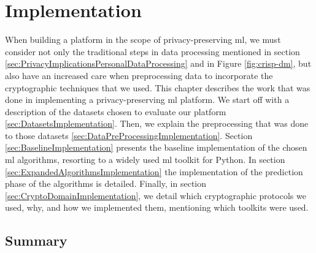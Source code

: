 %

\acresetall

\chapter{Implementation}
\label{ch:Implementation}

When building a platform in the scope of privacy-preserving \ac{ml}, we must consider not only the traditional steps in data processing mentioned in section \ref{sec:PrivacyImplicationsPersonalDataProcessing} and in Figure \ref{fig:crisp-dm}, but also have an increased care when preprocessing data to incorporate the cryptographic techniques that we used.
This chapter describes the work that was done in implementing a privacy-preserving \ac{ml} platform. We start off with a description of the datasets chosen to evaluate our platform \ref{sec:DatasetsImplementation}. Then, we explain the preprocessing that was done to those datasets \ref{sec:DataPreProcessingImplementation}.
Section \ref{sec:BaselineImplementation} presents the baseline implementation of the chosen \ac{ml} algorithms, resorting to a widely used \ac{ml} toolkit for Python.
In section \ref{sec:ExpandedAlgorithmsImplementation} the implementation of the prediction phase of the algorithms is detailed.
Finally, in section \ref{sec:CryptoDomainImplementation}, we detail which cryptographic protocols we used, why, and how we implemented them, mentioning which toolkits were used.










  
\section{Summary}
\label{sec:SummaryBARD}



